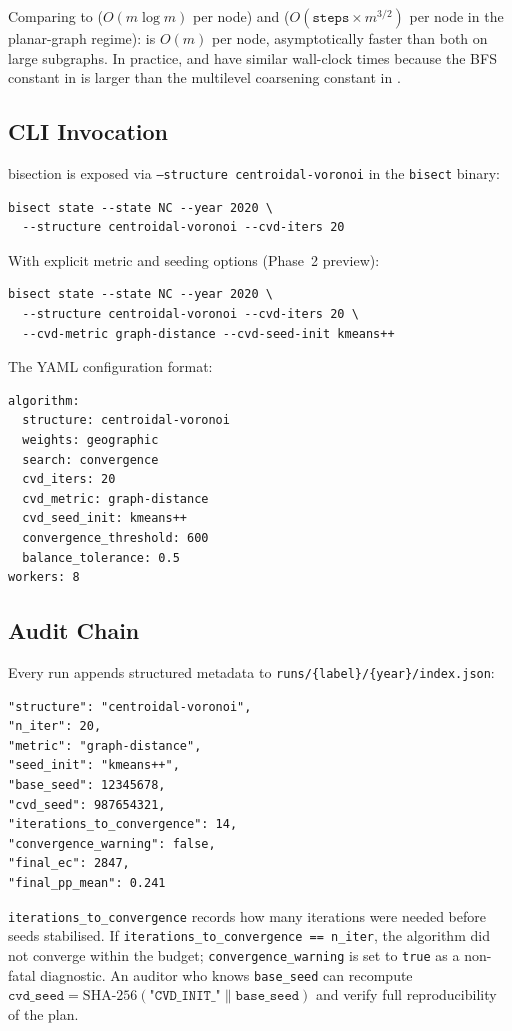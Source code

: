 Comparing to \metis{} ($O(m \log m)$ per node) and \sa{} ($O(\mathtt{steps} \times m^{3/2})$
per node in the planar-graph regime): \cvd{} is $O(m)$ per node,
asymptotically faster than both on large subgraphs.
In practice, \cvd{} and \metis{} have similar wall-clock times because the
BFS constant in \cvd{} is larger than the multilevel coarsening constant
in \metis{}.

\subsection{CLI Invocation}

\cvd{} bisection is exposed via \texttt{--structure centroidal-voronoi}
in the \texttt{bisect} binary:

\begin{verbatim}
bisect state --state NC --year 2020 \
  --structure centroidal-voronoi --cvd-iters 20
\end{verbatim}

With explicit metric and seeding options (Phase~2 preview):
\begin{verbatim}
bisect state --state NC --year 2020 \
  --structure centroidal-voronoi --cvd-iters 20 \
  --cvd-metric graph-distance --cvd-seed-init kmeans++
\end{verbatim}

The YAML configuration format:
\begin{verbatim}
algorithm:
  structure: centroidal-voronoi
  weights: geographic
  search: convergence
  cvd_iters: 20
  cvd_metric: graph-distance
  cvd_seed_init: kmeans++
  convergence_threshold: 600
  balance_tolerance: 0.5
workers: 8
\end{verbatim}

\subsection{Audit Chain}

Every \cvd{} run appends structured metadata to
\texttt{runs/\{label\}/\{year\}/index.json}:

\begin{verbatim}
"structure": "centroidal-voronoi",
"n_iter": 20,
"metric": "graph-distance",
"seed_init": "kmeans++",
"base_seed": 12345678,
"cvd_seed": 987654321,
"iterations_to_convergence": 14,
"convergence_warning": false,
"final_ec": 2847,
"final_pp_mean": 0.241
\end{verbatim}

\texttt{iterations\_to\_convergence} records how many iterations were needed
before seeds stabilised.
If \texttt{iterations\_to\_convergence == n\_iter}, the algorithm did not
converge within the budget; \texttt{convergence\_warning} is set to
\texttt{true} as a non-fatal diagnostic.
An auditor who knows \texttt{base\_seed} can recompute
$\mathtt{cvd\_seed} = \mathrm{SHA\text{-}256}(\texttt{"CVD\_INIT\_"} \| \mathtt{base\_seed})$
and verify full reproducibility of the plan.
